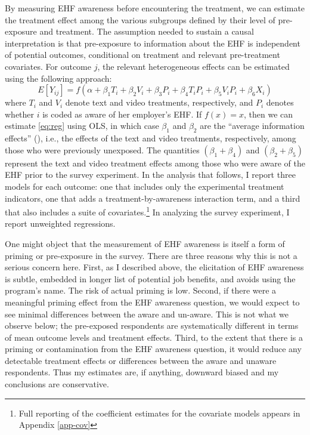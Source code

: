 \documentclass[
  11pt,
  oneside]{article}
\begin{document}
By measuring EHF awareness before encountering the treatment, we can estimate the treatment effect among the various subgroups defined by their level of pre-exposure and treatment. The assumption needed to sustain a causal interpretation is that pre-exposure to information about the EHF is independent of potential outcomes, conditional on treatment and relevant pre-treatment covariates. For outcome \(j\), the relevant heterogeneous effects can be estimated using the following approach:
\begin{equation}
E[Y_{ij}] = f(\alpha + \beta_1 T_i + \beta_2 V_i + \beta_3 P_i + \beta_4 T_iP_i + \beta_5 V_iP_i + \beta_6 X_i)
\label{eq:reg}
\end{equation}
where \(T_i\) and \(V_i\) denote text and video treatments, respectively, and \(P_i\) denotes whether \(i\) is coded as aware of her employer's EHF. If \(f(x) = x\), then we can estimate \eqref{eq:reg} using OLS, in which case \(\beta_1\) and \(\beta_2\) are the ``average information effects'' (), i.e., the effects of the text and video treatments, respectively, among those who were previously unexposed. The quantities \((\beta_1+\beta_4)\) and \((\beta_2+\beta_5)\) represent the text and video treatment effects among those who were aware of the EHF prior to the survey experiment. In the analysis that follows, I report three models for each outcome: one that includes only the experimental treatment indicators, one that adds a treatment-by-awareness interaction term, and a third that also includes a suite of covariates.\footnote{Full reporting of the coefficient estimates for the covariate models appears in Appendix \ref{app-cov}} In analyzing the survey experiment, I report unweighted regressions.

One might object that the measurement of EHF awareness is itself a form of priming or pre-exposure in the survey. There are three reasons why this is not a serious concern here. First, as I described above, the elicitation of EHF awareness is subtle, embedded in longer list of potential job benefits, and avoids using the program's name. The risk of actual priming is low. Second, if there were a meaningful priming effect from the EHF awareness question, we would expect to see minimal differences between the aware and un-aware. This is not what we observe below; the pre-exposed respondents are systematically different in terms of mean outcome levels and treatment effects. Third, to the extent that there is a priming or contamination from the EHF awareness question, it would reduce any detectable treatment effects or differences between the aware and unaware respondents. Thus my estimates are, if anything, downward biased and my conclusions are conservative.
\end{document}
